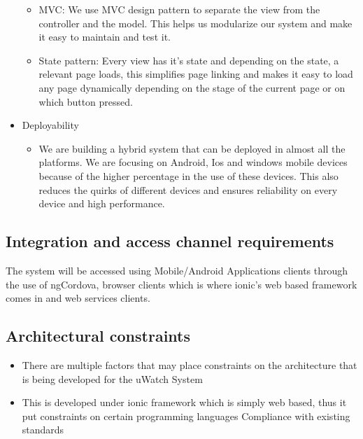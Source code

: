 \documentclass[a4paper,12pt]{article}
\begin{document}
\begin{itemize}
\begin{itemize}
		\item MVC: We use MVC design pattern to separate the view from the controller and the model. This helps us modularize our system and make it easy to maintain and test it. 
		\item State pattern: Every view has it's state and depending on the state, a relevant page loads, this simplifies page linking and makes it easy to load any page dynamically depending on the stage of the current page or on which button pressed.   
	\end{itemize}
\item Deployability
	\begin{itemize}
		\item We are building a hybrid system that can be deployed in almost all the platforms. We are focusing on Android, Ios and windows mobile devices because of the higher percentage in the use of these devices. This also reduces the quirks of different devices and ensures reliability on every device and high performance.  
	\end{itemize}
\end{itemize}
\subsection{Integration and access channel requirements}
The system will be accessed using Mobile/Android Applications clients through the use of ngCordova,  browser clients which is where ionic's web based framework comes in and web services clients.
\subsection{Architectural constraints}
\begin{itemize}
\item There are multiple factors that may place constraints on the architecture that
is being developed for the uWatch System

\item This is developed under ionic framework which is simply web based, thus it put constraints on certain programming languages Compliance with existing standards
\end{itemize}
\end{document}
